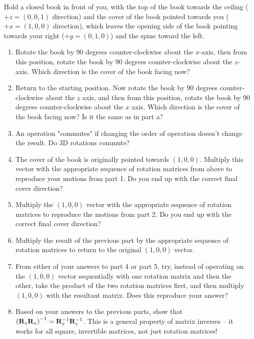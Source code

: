\begin{prob}
Hold a closed book in front of you, with the top of the book towards the ceiling ($+z = (0,0,1)$ direction) and the cover of the book pointed towards you ($+x = (1,0,0)$ direction), which leaves the opening side of the book pointing towards your right ($+y = (0,1,0)$) and the spine toward the left.
    \begin{enumerate}
    \item  Rotate the book by 90 degrees counter-clockwise about the $x$-axis, then from this position, rotate the book by 90 degrees counter-clockwise about the $z$-axis.  Which direction is the cover of the book facing now?
    \item  Return to the starting position.  Now rotate the book by 90 degrees counter-clockwise about the $z$ axis, and then from this position, rotate the book by 90 degrees counter-clockwise about the $x$ axis.  Which direction is the cover of the book facing now?  Is it the same as in part a?
    \item  An operation "commutes" if changing the order of operation doesn't change the result. Do 3D rotations commute? 
    \item  The cover of the book is originally pointed towards $(1,0,0)$.  Multiply this vector with the appropriate sequence of rotation matrices from above to reproduce your motions from part 1.  Do you end up with the correct final cover direction?
    \item  Multiply the $(1,0,0)$ vector with the appropriate sequence of rotation matrices to reproduce the motions from part 2.  Do you end up with the correct final cover direction?
    \item Multiply the result of the previous part by the appropriate sequence of rotation matrices to return to the original $(1,0,0)$ vector.
    \item  From either of your answers to part 4 or part 5, try, instead of operating on the $(1,0,0)$ vector sequentially with one rotation matrix and then the other, take the product of the two rotation matrices first, and then multiply $(1,0,0)$ with the resultant matrix.  Does this reproduce your answer?
    \item Based on your answers to the previous parts, show that $\left(\mathbf{R}_z \mathbf{R}_x\right)^{-1} = \mathbf{R}_x^{-1} \mathbf{R}_z^{-1}$. This is a general property of matrix inverses -- it works for all square, invertible matrices, not just rotation matrices!
    \end{enumerate}
\end{prob}
